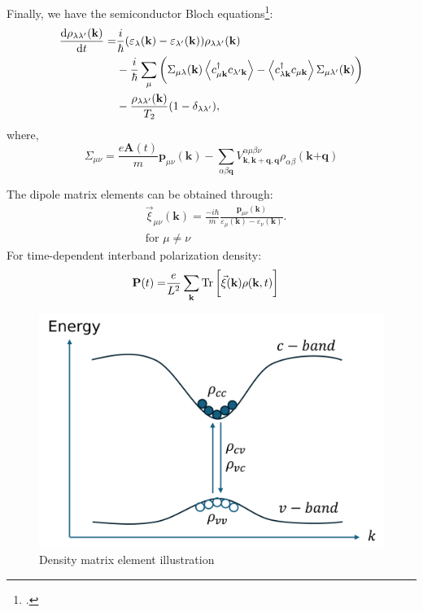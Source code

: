 \documentclass{beamer}
\begin{document}
\begin{frame}
Finally, we have the semiconductor Bloch equations\footcite{haug_quantum_2009}:
\begin{align}
	\dv{\rho_{\lambda\lambda'}(\textbf{k})}{t} = &\frac{i}{\hbar} (\varepsilon_{\lambda}(\textbf{k}) - \varepsilon_{\lambda'}(\textbf{k}))\rho_{\lambda\lambda'}(\textbf{k})\nonumber\\
	&-\frac{i}{\hbar} \sum_{\mu}\bigg(\Sigma_{\mu \lambda}(\textbf{k}) \ev{c^{\dagger}_{\mu\textbf{k}} c_{\lambda'\textbf{k}}} - \ev{c^{\dagger}_{\lambda\textbf{k}} c_{\mu\textbf{k}}} \Sigma_{\mu \lambda'}(\textbf{k})\bigg)\\ &-\frac{\rho_{\lambda\lambda'}(\textbf{k})}{T_2}(1-\delta_{\lambda\lambda'}),\nonumber
\end{align}
where,
\begin{equation}
	\Sigma_{\mu\nu} = \frac{e\textbf{A}(t)}{m}\textbf{p}_{\mu\nu}(\textbf{k}) - \sum_{\alpha\beta\textbf{q}} V^{\alpha \mu \beta \nu}_{\textbf{k},\textbf{k}+\textbf{q},\textbf{q}}\rho_{\alpha \beta}(\textbf{k+q})
\end{equation}
\end{frame}
\begin{frame}
	\begin{multicols}{2}
The dipole matrix elements can be obtained through:
		\begin{align}
			&\vec{\xi}_{\mu\nu}(\textbf{k}) = \frac{-i\hbar}{m}\frac{\textbf{p}_{\mu\nu}(\textbf{k})}{\varepsilon_{\mu}(\textbf{k}) - \varepsilon_{\nu}(\textbf{k})}.\\
			&\text{for } \mu \neq \nu \nonumber
		\end{align}
For time-dependent interband polarization density:
		\begin{align}
			\textbf{P}(t) = &\frac{e}{L^2} \sum_{\textbf{k}} \Tr\bigg[\vec{\xi}(\textbf{k})\rho(\textbf{k},t)\bigg]
		\end{align}
		\columnbreak
		\begin{figure}
			\includegraphics[width=1\linewidth]{images/cvbeamer.pdf}
			\caption{Density matrix element illustration}
		\end{figure}
	\end{multicols}
\end{frame}
\end{document}
